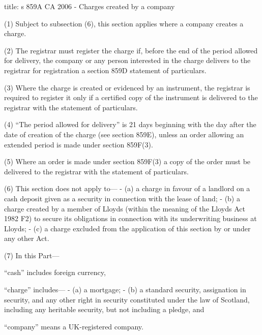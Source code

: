 \documentclass[
]{article}
\newenvironment{Shaded}{}{}
\newcommand{\NormalTok}[1]{#1}
\begin{document}
\begin{Shaded}
\begin{Highlighting}[]
\NormalTok{title: s 859A CA 2006 {-} Charges created by a company}

\NormalTok{(1) Subject to subsection (6), this section applies where a company creates a charge.}

\NormalTok{(2) The registrar must register the charge if, before the end of the period allowed for delivery, the company or any person interested in the charge delivers to the registrar for registration a section 859D statement of particulars.}

\NormalTok{(3) Where the charge is created or evidenced by an instrument, the registrar is required to register it only if a certified copy of the instrument is delivered to the registrar with the statement of particulars.}

\NormalTok{(4) “The period allowed for delivery” is 21 days beginning with the day after the date of creation of the charge (see section 859E), unless an order allowing an extended period is made under section 859F(3).}

\NormalTok{(5) Where an order is made under section 859F(3) a copy of the order must be delivered to the registrar with the statement of particulars.}

\NormalTok{(6) This section does not apply to—}
\NormalTok{{-} (a) a charge in favour of a landlord on a cash deposit given as a security in connection with the lease of land;}
\NormalTok{{-} (b) a charge created by a member of Lloyd\textquotesingle{}s (within the meaning of the Lloyd\textquotesingle{}s Act 1982 F2) to secure its obligations in connection with its underwriting business at Lloyd\textquotesingle{}s;}
\NormalTok{{-} (c) a charge excluded from the application of this section by or under any other Act.}

\NormalTok{(7) In this Part—}

\NormalTok{“cash” includes foreign currency,}

\NormalTok{“charge” includes—}
\NormalTok{{-} (a) a mortgage;}
\NormalTok{{-} (b) a standard security, assignation in security, and any other right in security constituted under the law of Scotland, including any heritable security, but not including a pledge, and}

\NormalTok{“company” means a UK{-}registered company.}
\end{Highlighting}
\end{Shaded}
\end{document}

